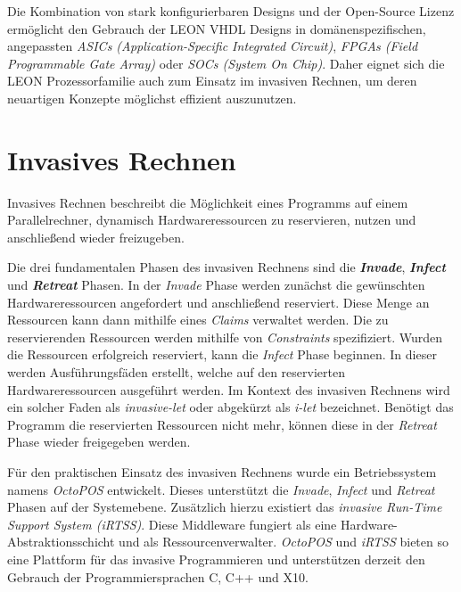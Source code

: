Die Kombination von stark konfigurierbaren Designs und der Open-Source Lizenz ermöglicht den Gebrauch der
LEON VHDL Designs in domänenspezifischen, angepassten \textit{ASICs (Application-Specific Integrated Circuit)},
\textit{FPGAs (Field Programmable Gate Array)} oder \textit{SOCs (System On Chip)}.
Daher eignet sich die LEON Prozessorfamilie auch zum Einsatz im invasiven Rechnen,
um deren neuartigen Konzepte möglichst effizient auszunutzen. \cite{sparcv8Eval}

\section{Invasives Rechnen}

Invasives Rechnen beschreibt die Möglichkeit eines Programms auf einem Parallelrechner,
dynamisch Hardwareressourcen zu reservieren, nutzen und anschließend wieder freizugeben.\cite{octopos}

Die drei fundamentalen Phasen des invasiven Rechnens sind die \textit{\textbf{Invade}}, \textit{\textbf{Infect}}
und \textit{\textbf{Retreat}} Phasen. In der \textit{Invade} Phase werden zunächst die gewünschten
Hardwareressourcen angefordert und anschließend reserviert. Diese Menge an Ressourcen kann dann mithilfe
eines \textit{Claims} verwaltet werden. Die zu reservierenden Ressourcen werden mithilfe von \textit{Constraints}
spezifiziert.
Wurden die Ressourcen erfolgreich reserviert, kann die \textit{Infect}
Phase beginnen. In dieser werden Ausführungsfäden erstellt,
welche auf den reservierten Hardwareressourcen ausgeführt werden. Im Kontext des invasiven Rechnens wird ein solcher
Faden als \textit{invasive-let} oder abgekürzt als \textit{i-let} bezeichnet\cite{invasiveCommonTerms}.
Benötigt das Programm die reservierten Ressourcen nicht mehr, können diese in der \textit{Retreat} Phase wieder
freigegeben werden.\cite{octopos}

Für den praktischen Einsatz des invasiven Rechnens wurde ein Betriebssystem namens \textit{OctoPOS} entwickelt.
Dieses unterstützt die \textit{Invade}, \textit{Infect} und \textit{Retreat} Phasen auf der Systemebene.
Zusätzlich hierzu existiert das \textit{invasive Run-Time Support System (iRTSS)}. Diese Middleware
fungiert als eine Hardware-Abstraktionsschicht und als Ressourcenverwalter.
\textit{OctoPOS} und \textit{iRTSS} bieten so eine Plattform für das invasive Programmieren und
unterstützen derzeit den Gebrauch der Programmiersprachen C, C++ und X10.
\cite{octopos}\cite{invasiveManyCore}\cite{invasiveRISC}

